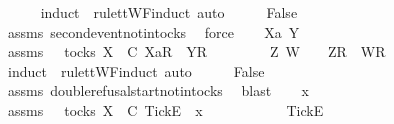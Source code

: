 \begin{isabellebody}
\ \ \ \ \isamarkupfalse%
\ {\isacharparenleft}induct\ {\isasymrho}\ rule{\isacharcolon}ttWF{\isachardot}induct{\isacharcomma}\ auto{\isacharparenright}\isanewline
\ \ \isamarkupfalse%
\ \isamarkupfalse%
\ False\isanewline
\ \ \ \ \isamarkupfalse%
\ assms{\isacharparenleft}{}{\isacharparenright}\ second{\isacharunderscore}event{\isacharunderscore}notin{\isacharunderscore}tocks\ \isamarkupfalse%
\ force\isanewline
{}\isamarkupfalse%
\isanewline
\ \ \isamarkupfalse%
\ Xa\ Y\ {\isasymrho}\ {\isasymsigma}\isanewline
\ \ \isamarkupfalse%
\ assms{\isacharcolon}\ {\isachardoublequoteopen}{\isasymrho}\ {\isasymin}\ tocks\ X{\isachardoublequoteclose}\ {\isachardoublequoteopen}{\isasymrho}\ {\isasymsubseteq}\isactrlsub C\ {\isacharbrackleft}Xa{\isacharbrackright}\isactrlsub R\ {\isacharhash}\ {\isacharbrackleft}Y{\isacharbrackright}\isactrlsub R\ {\isacharhash}\ {\isasymsigma}{\isachardoublequoteclose}\isanewline
\ \ \isamarkupfalse%
\ \isamarkupfalse%
\ {\isasymrho}{\isacharprime}\ Z\ W\ \ {\isachardoublequoteopen}{\isasymrho}\ {\isacharequal}\ {\isacharbrackleft}Z{\isacharbrackright}\isactrlsub R\ {\isacharhash}\ {\isacharbrackleft}W{\isacharbrackright}\isactrlsub R\ {\isacharhash}\ {\isasymrho}{\isacharprime}{\isachardoublequoteclose}\isanewline
\ \ \ \ \isamarkupfalse%
\ {\isacharparenleft}induct\ {\isasymrho}\ rule{\isacharcolon}ttWF{\isachardot}induct{\isacharcomma}\ auto{\isacharparenright}\isanewline
\ \ \isamarkupfalse%
\ \isamarkupfalse%
\ False\isanewline
\ \ \ \ \isamarkupfalse%
\ assms{\isacharparenleft}{}{\isacharparenright}\ double{\isacharunderscore}refusal{\isacharunderscore}start{\isacharunderscore}notin{\isacharunderscore}tocks\ \isamarkupfalse%
\ blast\isanewline
{}\isamarkupfalse%
\isanewline
\ \ \isamarkupfalse%
\ x\ {\isasymrho}\ {\isasymsigma}\isanewline
\ \ \isamarkupfalse%
\ assms{\isacharcolon}\ {\isachardoublequoteopen}{\isasymrho}\ {\isasymin}\ tocks\ X{\isachardoublequoteclose}\ {\isachardoublequoteopen}{\isasymrho}\ {\isasymsubseteq}\isactrlsub C\ {\isacharbrackleft}Tick{\isacharbrackright}\isactrlsub E\ {\isacharhash}\ x\ {\isacharhash}\ {\isasymsigma}{\isachardoublequoteclose}\isanewline
\ \ \isamarkupfalse%
\ \isamarkupfalse%
\ {\isasymrho}{\isacharprime}\ \ {\isachardoublequoteopen}{\isasymrho}\ {\isacharequal}\ {\isacharbrackleft}Tick{\isacharbrackright}\isactrlsub E\ {\isacharhash}\ {\isasymrho}{\isacharprime}{\isachardoublequoteclose}\isanewline

\end{isabellebody}
